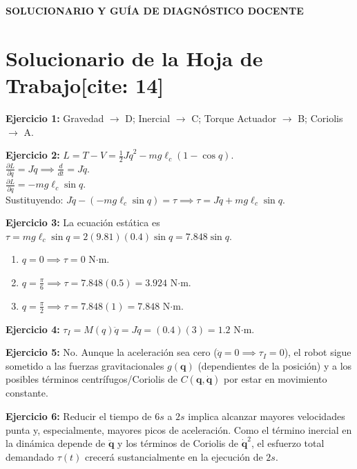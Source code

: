 \documentclass[11pt, a4paper]{article}
\begin{document}
\begin{center}
    \Large\textbf{\textcolor{red!80!black}{SOLUCIONARIO Y GUÍA DE DIAGNÓSTICO DOCENTE}}\\[0.2cm]
\end{center}

\section*{Solucionario de la Hoja de Trabajo[cite: 14]}

\textbf{Ejercicio 1:} Gravedad $\to$ D; Inercial $\to$ C; Torque Actuador $\to$ B; Coriolis $\to$ A.

\textbf{Ejercicio 2:} 
$L = T - V = \frac{1}{2}J\dot{q}^2 - mg\ell_c(1 - \cos q)$. \\
$\frac{\partial L}{\partial \dot{q}} = J\dot{q} \implies \frac{d}{dt} = J\ddot{q}$. \\
$\frac{\partial L}{\partial q} = -mg\ell_c\sin q$. \\
Sustituyendo: $J\ddot{q} - (-mg\ell_c\sin q) = \tau \implies \tau = J\ddot{q} + mg\ell_c\sin q$.

\textbf{Ejercicio 3:} La ecuación estática es $\tau = mg\ell_c\sin q = 2(9.81)(0.4)\sin q = 7.848 \sin q$.
\begin{enumerate}
    \item $q = 0 \implies \tau = 0$ N$\cdot$m.
    \item $q = \frac{\pi}{6} \implies \tau = 7.848(0.5) = 3.924$ N$\cdot$m.
    \item $q = \frac{\pi}{2} \implies \tau = 7.848(1) = 7.848$ N$\cdot$m.
\end{enumerate}

\textbf{Ejercicio 4:} $\tau_I = M(q)\ddot{q} = J\ddot{q} = (0.4)(3) = 1.2$ N$\cdot$m.

\textbf{Ejercicio 5:} No. Aunque la aceleración sea cero ($\ddot{q}=0 \implies \tau_I = 0$), el robot sigue sometido a las fuerzas gravitacionales $g(\mathbf{q})$ (dependientes de la posición) y a los posibles términos centrífugos/Coriolis de $C(\mathbf{q}, \dot{\mathbf{q}})$ por estar en movimiento constante.

\textbf{Ejercicio 6:} Reducir el tiempo de $6s$ a $2s$ implica alcanzar mayores velocidades punta y, especialmente, mayores picos de aceleración. Como el término inercial en la dinámica depende de $\ddot{\mathbf{q}}$ y los términos de Coriolis de $\dot{\mathbf{q}}^2$, el esfuerzo total demandado $\tau(t)$ crecerá sustancialmente en la ejecución de $2s$.
\end{document}
